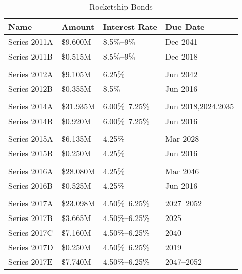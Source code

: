 \begin{table}[ht]
  \SingleSpacing
  \caption{Rocketship Bonds}%
  \label{tab:rocketship_bonds}
  \begin{tabular}{llll}
    \toprule
    Name             & Amount    & Interest Rate  & Due Date           \\
    \midrule
    Series 2011A     & \$9.600M  & 8.5\%–9\%      & Dec 2041           \\
    Series 2011B     & \$0.515M  & 8.5\%–9\%      & Dec 2018           \\
                                                                       \\
    Series 2012A     & \$9.105M  & 6.25\%         & Jun 2042           \\
    Series 2012B     & \$0.355M  & 8.5\%          & Jun 2016           \\
                                                                       \\
    Series 2014A     & \$31.935M & 6.00\%–7.25\%  & Jun 2018,2024,2035 \\
    Series 2014B     & \$0.920M  & 6.00\%–7.25\%  & Jun 2016           \\
                                                                       \\
    Series 2015A     & \$6.135M  & 4.25\%         & Mar 2028           \\
    Series 2015B     & \$0.250M  & 4.25\%         & Jun 2016           \\
                                                                       \\
    Series 2016A     & \$28.080M & 4.25\%         & Mar 2046           \\
    Series 2016B     & \$0.525M  & 4.25\%         & Jun 2016           \\
                                                                       \\
    Series 2017A     & \$23.098M & 4.50\%–6.25\%  & 2027–2052          \\
    Series 2017B     & \$3.665M  & 4.50\%–6.25\%  & 2025               \\
    Series 2017C     & \$7.160M  & 4.50\%–6.25\%  & 2040               \\
    Series 2017D     & \$0.250M  & 4.50\%–6.25\%  & 2019               \\
    Series 2017E     & \$7.740M  & 4.50\%–6.25\%  & 2047–2052          \\

\end{tabular}
\end{table}
